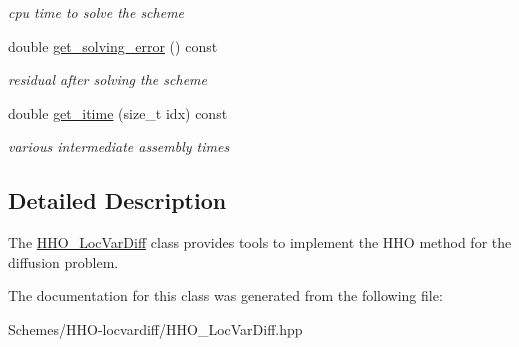 \begin{DoxyCompactItemize}
\begin{DoxyCompactList}\small\item\em cpu time to solve the scheme \end{DoxyCompactList}\item 
double \hyperlink{group__HHO__LocVarDiff_ga22542468093ee4e8e24d8c0a27946f8f}{get\+\_\+solving\+\_\+error} () const
\begin{DoxyCompactList}\small\item\em residual after solving the scheme \end{DoxyCompactList}\item 
double \hyperlink{group__HHO__LocVarDiff_gae66d0e79903e2ca077ff2515c20d7d2e}{get\+\_\+itime} (size\+\_\+t idx) const
\begin{DoxyCompactList}\small\item\em various intermediate assembly times \end{DoxyCompactList}\end{DoxyCompactItemize}


\subsection{Detailed Description}
The \hyperlink{classHArDCore3D_1_1HHO__LocVarDiff}{H\+H\+O\+\_\+\+Loc\+Var\+Diff} class provides tools to implement the H\+HO method for the diffusion problem. 

The documentation for this class was generated from the following file\+:\begin{DoxyCompactItemize}
\item 
Schemes/\+H\+H\+O-\/locvardiff/H\+H\+O\+\_\+\+Loc\+Var\+Diff.\+hpp\end{DoxyCompactItemize}
